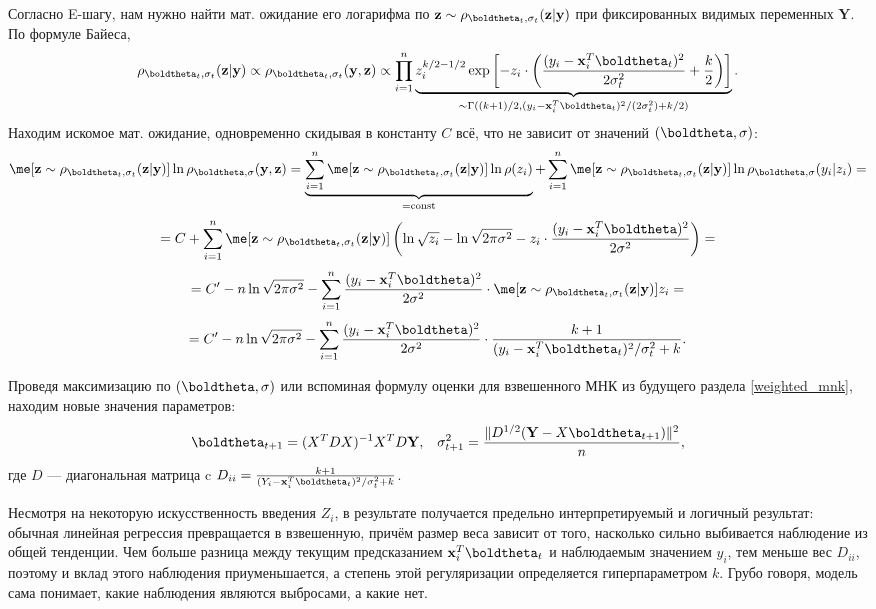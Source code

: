 \begin{example}
	Согласно E-шагу, нам нужно найти мат. ожидание его логарифма по $\mathbf z \sim \rho_{\boldtheta_t, \sigma_t}(\mathbf z | \mathbf y)$ при фиксированных видимых переменных $\mathbf Y$. По формуле Байеса,
	\[
	\rho_{\boldtheta_t, \sigma_t}(\mathbf z | \mathbf y) \propto \rho_{\boldtheta_t, \sigma_t}(\mathbf y,  \mathbf z) \propto \prod_{i=1}^n \underbrace{z_i^{k/2-1/2} \exp\left[-z_i \cdot \left(\frac{(y_i-\mathbf{x}_i^T \boldtheta_t)^2}{2\sigma_t^2} + \frac{k}{2}\right)\right]}_{\sim \Gamma((k+1)/2, (y_i-\mathbf{x}_i^T \boldtheta_t)^2 /(2\sigma_t^2)+k/2)}.
	\]
	Находим искомое мат. ожидание, одновременно скидывая в константу $C$ всё, что не зависит от значений $(\boldtheta, \sigma)$:
	\[
	\me[\mathbf z \sim \rho_{\boldtheta_t, \sigma_t}(\mathbf z | \mathbf y)] \ln \rho_{\boldtheta, \sigma}(\mathbf y, \mathbf z) = \underbrace{\sum_{i=1}^n \me[\mathbf z \sim \rho_{\boldtheta_t, \sigma_t}(\mathbf z | \mathbf y)]\ln \rho(z_i)}_{=\textrm{const}} + \sum_{i=1}^n \me[\mathbf z \sim \rho_{\boldtheta_t, \sigma_t}(\mathbf z | \mathbf y)] \ln \rho_{\boldtheta, \sigma}(y_i | z_i) = 
	\]
	\[
	= C + \sum_{i=1}^n \me[\mathbf z \sim \rho_{\boldtheta_t, \sigma_t}(\mathbf z | \mathbf y)] \left(\ln{\sqrt{z_i}} - \ln{\sqrt{2\pi \sigma^2}} - z_i \cdot \frac{(y_i-\mathbf{x}_i^T \boldtheta)^2}{2\sigma^2} \right) =
	\]
	\[
	= C' - n\ln{\sqrt{2\pi \sigma^2}} - \sum_{i=1}^n \frac{(y_i-\mathbf{x}_i^T \boldtheta)^2}{2\sigma^2} \cdot \me[\mathbf z \sim \rho_{\boldtheta_t, \sigma_t}(\mathbf z | \mathbf y)] z_i =
	\]
	\[
	= C' - n\ln{\sqrt{2\pi \sigma^2}} - \sum_{i=1}^n \frac{(y_i-\mathbf{x}_i^T \boldtheta)^2}{2\sigma^2} \cdot \frac{k+1}{(y_i-\mathbf{x}_i^T \boldtheta_t)^2 / \sigma_t^2+k}.
	\]
	
	Проведя максимизацию по $(\boldtheta, \sigma)$ или вспоминая формулу оценки для взвешенного МНК из будущего раздела \ref{weighted_mnk}, находим новые значения параметров:
	\[
	\boldtheta_{t+1} = (X^T D X)^{-1} X^T D \mathbf Y, \;\;\; \sigma_{t+1}^2 = \frac{\|D^{1/2}(\mathbf Y - X\boldtheta_{t+1})\|^2}{n},
	\]
	где $D$ --- диагональная матрица c $D_{ii} = \frac{k+1}{(Y_i-\mathbf{x}_i^T \boldtheta_t)^2 / \sigma_t^2+k}$.
	
	Несмотря на некоторую искусственность введения $Z_i$, в результате получается предельно интерпретируемый и логичный результат: обычная линейная регрессия превращается в взвешенную, причём размер веса зависит от того, насколько сильно выбивается наблюдение из общей тенденции. Чем больше разница между текущим предсказанием $\mathbf{x}_i^T \boldtheta_t$ и наблюдаемым значением $y_i$, тем меньше вес $D_{ii}$, поэтому и вклад этого наблюдения приуменьшается, а степень этой регуляризации определяется гиперпараметром $k$. Грубо говоря, модель сама понимает, какие наблюдения являются выбросами, а какие нет.
\end{example}

